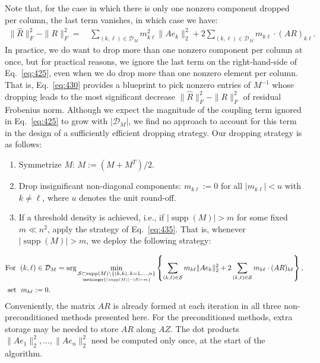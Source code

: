 \documentclass[numbers,webpdf,imanum]{ima-authoring-template}%
\theoremstyle{thmstyletwo}%
\numberwithin{equation}{section}
\begin{document}
Note that, for the case in which there is only one nonzero component dropped per column, the last term vanishes, in which case we have:
\begin{align}\label{eq:430}
\|\widehat{R}\|_F^2-\|R\|_F^2
=&\,
\sum_{(k,\ell)\in \mathcal{D}_M}
m_{k\ell}^2\|Ae_k\|_2^2
+2\sum_{(k,\ell)\in \mathcal{D}_M} m_{k\ell}\cdot(AR)_{k\ell}.
\end{align}
In practice, we do want to drop more than one nonzero component per column at once, but for practical reasons, we ignore the last term on the right-hand-side of Eq.~\eqref{eq:425}, even when we do drop more than one nonzero element per column.
That is, Eq.~\eqref{eq:430} provides a blueprint to pick nonzero entries of $M^{-1}$ whose dropping leads to the most significant decrease $\|\widehat{R}\|_F^2-\|R\|_F^2$ of residual Frobenius norm.
Although we expect the magnitude of the coupling term ignored in Eq.~\eqref{eq:425} to grow with $|\mathcal{D}_M|$, we find no approach to account for this term in the design of a sufficiently efficient dropping strategy.
Our dropping strategy is as follows:
\begin{enumerate}
\item Symmetrize $M$: $M:=\left(M+M^T\right)/2$.
\item Drop insignificant non-diagonal components: $m_{k\ell}:=0$ for all $|m_{k\ell}|<u$ with $k\neq \ell$, where $u$ denotes the unit round-off. 
\item If a threshold density is achieved, i.e., if $|\operatorname{supp}(M)|>m$ for some fixed $m\ll n^2$, apply the strategy of Eq.~\eqref{eq:435}.
That is,  whenever $|\operatorname{supp}(M)|>m$, we deploy the following strategy:
\end{enumerate}
\begin{align}\label{eq:435}
&\text{For }\;(k,\ell)\in
\mathcal{D}_M=
\arg
\underset{\underset{\mathlarger{|\operatorname{supp}(M)|-|\mathcal{S}|=m}}{\mathcal{S}\subset \operatorname{supp}(M)\setminus\{(k,k),\,k=1,\dots,n\}}}{\min}
\left\{
\sum_{(k,\ell)\in \mathcal{S}}
m_{k\ell}\|Ae_k\|_2^2
+2\sum_{(k,\ell)\in \mathcal{S}} m_{k\ell}\cdot(AR)_{k\ell}
\right\},\\
&\text{ set }\;
m_{k\ell}:=0.\nonumber
\end{align}
Conveniently, the matrix $AR$ is already formed at each iteration in all three non-preconditioned methods presented here.
For the preconditioned methods, extra storage may be needed to store $AR$ along $AZ$.
The dot products $\|Ae_1\|_2^2,\dots,\|Ae_n\|_2^2$ need be computed only once, at the start of the algorithm.
\end{document}
